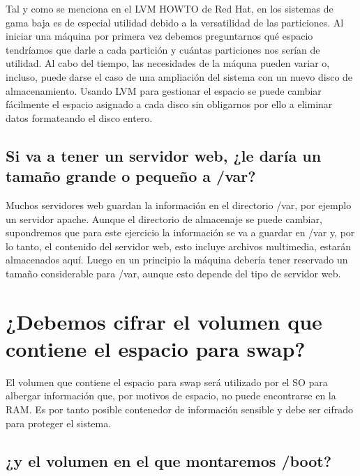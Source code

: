Tal y como se menciona en el LVM HOWTO\cite{lvm} de Red Hat, en los sistemas de gama baja es de especial utilidad debido a la versatilidad de las particiones.
Al iniciar una máquina por primera vez debemos preguntarnos qué espacio tendríamos que darle a cada partición y cuántas particiones nos serían de utilidad.
Al cabo del tiempo, las necesidades de la máquna pueden variar o, incluso, puede darse el caso de una ampliación del sistema con un nuevo disco de almacenamiento.
Usando LVM para gestionar el espacio se puede cambiar fácilmente el espacio asignado a cada disco sin obligarnos por ello a eliminar datos formateando el disco entero. 

\vspace{6mm}

\subsection{Si va a tener un servidor web, ¿le daría un tamaño grande o pequeño a /var?}

Muchos servidores web guardan la información en el directorio /var\cite{dir}, por ejemplo un servidor apache\cite{apache}. Aunque el directorio de almacenaje se puede cambiar,
supondremos que para este ejercicio la información se va a guardar en /var y, por lo tanto, el contenido del servidor web, esto incluye archivos multimedia, estarán
almacenados aquí. Luego en un principio la máquina debería tener reservado un tamaño considerable para /var, aunque esto depende del tipo de servidor web.






\section{¿Debemos cifrar el volumen que contiene el espacio para swap?}

El volumen que contiene el espacio para swap será utilizado por el SO para albergar información que, por motivos de espacio, no puede encontrarse en la RAM\cite{swap}.
Es por tanto posible contenedor de información sensible y debe ser cifrado para proteger el sistema.

\subsection{¿y el volumen en el que montaremos /boot?}

